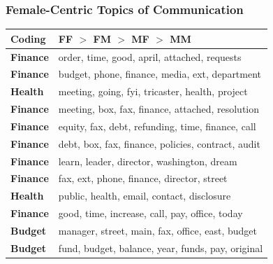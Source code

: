 \documentclass[xcolor={table}]{beamer}
\newcommand{\female}[1]{\colorbox{female}{#1}}
\newenvironment{changemargin}[2]{%
  \begin{list}{}{%
    \setlength{\topsep}{0pt}%
    \setlength{\leftmargin}{#1}%
    \setlength{\rightmargin}{#2}%
    \setlength{\listparindent}{\parindent}%
    \setlength{\itemindent}{\parindent}%
    \setlength{\parsep}{\parskip}%
  }%
  \item[]}{\end{list}}
\begin{document}
\begin{frame}\frametitle{Female-Centric Topics of Communication}
	
	
\begin{changemargin}{-1cm}{ -1cm}	
	\centering
		\begin{tabular}{ll}
			\toprule
	Coding & FF $>$ FM $>$ MF $>$ MM\\
	\midrule

	\female{\textbf{Finance}} & order, time, good, april, attached, requests \\ 
	\female{\textbf{Finance}} & budget, phone, finance, media, ext, department
	\\ 
	\textbf{Health} & meeting, going, fyi, tricaster, health, project
	 \\ 
	\female{\textbf{Finance}} & meeting, box, fax, finance, attached, resolution
	\\ 
	\female{\textbf{Finance}} & equity, fax, debt, refunding, time, finance, call
	 \\ 
	\female{\textbf{Finance}} & debt, box, fax, finance, policies, contract, audit
	\\ 
	\female{\textbf{Finance}} & learn, leader, director, washington, dream
	\\ 
	\female{\textbf{Finance}} & fax, ext, phone, finance, director, street
	\\ 
	\textbf{Health} & public, health, email, contact, disclosure

	\\ 
	\female{\textbf{Finance}} & good, time, increase, call, pay, office, today
	
	\\ 
	\female{\textbf{Budget}} & manager, street, main, fax, office, east, budget
	
	\\ 
	\female{\textbf{Budget}} & fund, budget, balance, year, funds, pay, original
	
	\\

			\bottomrule
		\end{tabular}
		\end{changemargin}
\end{frame}
\end{document}
